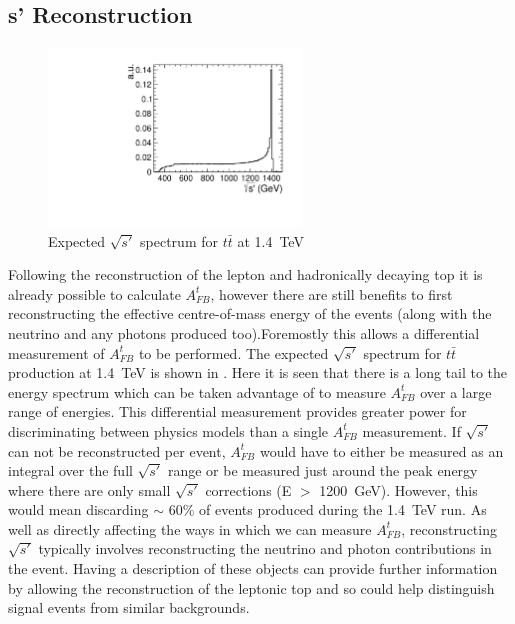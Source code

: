 \subsection{s' Reconstruction}
\label{sec:sprime}
\begin{figure}
  \centering
  \includegraphics[width=0.6\textwidth]{TopAnalysis/figures/GeneratorSPrime.pdf}
  \caption[Expected $\sqrt{s'}$ spectrum for $t\bar{t}$ at 1.4~TeV]{Expected $\sqrt{s'}$ spectrum for $t\bar{t}$ at 1.4~TeV}
  \label{fig:trueSPrime}
\end{figure}

Following the reconstruction of the lepton and hadronically decaying top it is already possible to calculate $A_{FB}^{t}$, however there are still benefits to first reconstructing the effective centre-of-mass energy of the events (along with the neutrino and any photons produced too).Foremostly this allows a differential measurement of $A_{FB}^{t}$ to be performed. The expected $\sqrt{s'}$ spectrum for $t\bar{t}$ production at 1.4~TeV is shown in . Here it is seen that there is a long tail to the energy spectrum which can be taken advantage of to measure $A_{FB}^{t}$ over a large range of energies. This differential measurement provides greater power for discriminating between physics models than a single $A_{FB}^{t}$ measurement. If $\sqrt{s'}$ can not be reconstructed per event, $A_{FB}^{t}$ would have to either be measured as an integral over the full $\sqrt{s'}$ range or be measured just around the peak energy where there are only small $\sqrt{s'}$ corrections (E $>$ 1200~GeV). However, this would mean discarding $\sim$ 60\% of events produced during the 1.4~TeV run. As well as directly affecting the ways in which we can measure $A_{FB}^{t}$, reconstructing $\sqrt{s'}$ typically involves reconstructing the neutrino and photon contributions in the event. Having a description of these objects can provide further information by allowing the reconstruction of the leptonic top and so could help distinguish signal events from similar backgrounds.

